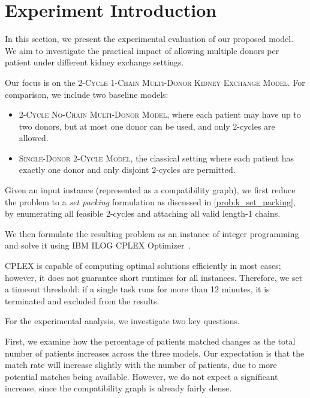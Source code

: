 \section{Experiment Introduction}

In this section, we present the experimental evaluation of our proposed model. We aim to investigate the practical impact of allowing multiple donors per patient under different kidney exchange settings.

Our focus is on the \textsc{2-Cycle 1-Chain Multi-Donor Kidney Exchange Model}. For comparison, we include two baseline models:
\begin{itemize}
\item \textsc{2-Cycle No-Chain Multi-Donor Model}, where each patient may have up to two donors, but at most one donor can be used, and only 2-cycles are allowed.
\item \textsc{Single-Donor 2-Cycle Model}, the classical setting where each patient has exactly one donor and only disjoint 2-cycles are permitted.
\end{itemize}

Given an input instance (represented as a compatibility graph), we first reduce the problem to a \emph{set packing} formulation as discussed in \autoref{prob:k_set_packing}, by enumerating all feasible 2-cycles and attaching all valid length-1 chains.

We then formulate the resulting problem as an instance of integer programming and solve it using IBM ILOG CPLEX Optimizer~\cite{cplex}.

CPLEX is capable of computing optimal solutions efficiently in most cases; however, it does not guarantee short runtimes for all instances. Therefore, we set a timeout threshold: if a single task runs for more than 12 minutes, it is terminated and excluded from the results.


For the experimental analysis, we investigate two key questions.

First, we examine how the percentage of patients matched changes as the total number of patients increases across the three models. Our expectation is that the match rate will increase slightly with the number of patients, due to more potential matches being available. However, we do not expect a significant increase, since the compatibility graph is already fairly dense.


